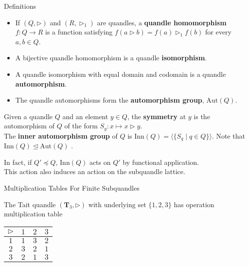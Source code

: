 \documentclass[10pt]{beamer}
\newcommand{\gen}[1]{\langle#1\rangle} %
\newcommand{\Aut}{\mathrm{Aut}} %
\newcommand{\normal}{\trianglelefteq} %
\newcommand{\sq}{\preccurlyeq} %
\newcommand{\thru}{\rhd} %
\newcommand{\Inn}{\mathrm{Inn}} %
\theoremstyle{plain}
\begin{document}
\begin{frame}{Definitions}
    \begin{definition}
\begin{itemize}
    \item If $(Q,\thru)$ and $(R,\thru_1)$ are quandles, a \textbf{quandle homomorphism} $f:Q\to R$ is a function satisfying $f(a\thru b)=f(a)\thru_1 f(b)$ for every $a,b\in Q$.
    \pause
    \item A bijective quandle homomorphism is a quandle \textbf{isomorphism}.
    \pause
    \item A quandle isomorphism with equal domain and codomain is a quandle \textbf{automorphism}.
    \pause
    \item The quandle automorphisms form the \textbf{automorphism group}, $\Aut(Q)$.
\end{itemize}
\end{definition}
\pause
\begin{definition}
Given a quandle $Q$ and an element $y\in Q$, the \textbf{symmetry} at $y$ is the automorphism of $Q$ of the form $S_y : x \mapsto x\thru y$. \\
\vspace{0.1in}
The \textbf{inner automorphism group} of $Q$ is $\Inn(Q)= \gen{\{S_q \mid q \in Q\}}.$ Note that $\Inn(Q)\normal \Aut(Q)$ \cite{Joyce1982}.
\end{definition}

In fact, if $Q'\sq Q$, $\Inn(Q)$ acts on $Q'$ by functional application. \\
This action also induces an action on the subquandle lattice.
\end{frame}

\begin{frame}{Multiplication Tables For Finite Subquandles}

\begin{example}
The Tait quandle $(\mathbf{T}_3,\thru)$ with underlying set $\{1,2,3\}$ has operation multiplication table
\begin{center}
    \begin{tabular}{c|c c c} 
        $\thru$ &$1$ &$2$ &$3$ \\
        \hline
         $1$ & $1$ & $3$ & $2$\\
         $2$ & $3$ & $2$ & $1$ \\
         $3$ & $2$ & $1$ & $3$
    \end{tabular}
\end{center}
\end{example}

    
\end{frame}
\end{document}
